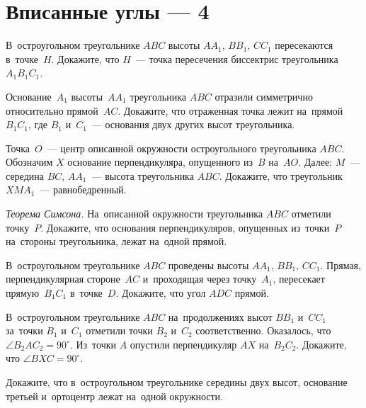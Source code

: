 
\section*{Вписанные углы --- 4}


\begin{problems}

\item
В~остроугольном треугольнике $ABC$ высоты $A A_1$, $B B_1$, $C C_1$
пересекаются в~точке~$H$.
Докажите, что $H$~--- точка пересечения биссектрис треугольника $A_1 B_1 C_1$.

\item
Основание~$A_1$ высоты~$A A_1$ треугольника $ABC$ отразили симметрично
относительно прямой~$AC$.
Докажите, что отраженная точка лежит на~прямой~$B_1 C_1$, где $B_1$ и~$C_1$~---
основания двух других высот треугольника.

\item
Точка~$O$~--- центр описанной окружности остроугольного треугольника $ABC$.
Обозначим $X$ основание перпендикуляра, опущенного из~$B$ на~$AO$.
Далее: $M$~--- середина $BC$, $A A_1$~--- высота треугольника $ABC$.
Докажите, что треугольник $X M A_1$~--- равнобедренный.

\item\emph{Теорема Симсона.}
На~описанной окружности треугольника $ABC$ отметили точку~$P$.
Докажите, что основания перпендикуляров, опущенных из~точки~$P$ на~стороны
треугольника, лежат на~одной прямой.

\item
В~остроугольном треугольнике $ABC$ проведены высоты $A A_1$, $B B_1$, $C C_1$.
Прямая, перпендикулярная стороне~$AC$ и~проходящая через точку~$A_1$,
пересекает прямую~$B_1 C_1$ в~точке~$D$.
Докажите, что угол $ADC$ прямой.

\item
В~остроугольном треугольнике $ABC$ на~продолжениях высот $BB_1$ и~$CC_1$
за~точки $B_1$ и~$C_1$ отметили точки $B_2$ и~$C_2$ соответственно.
Оказалось, что $\angle B_2AC_2 = 90^{\circ}$.
Из~точки $A$ опустили перпендикуляр $AX$ на~$B_2C_2$.
Докажите, что $\angle BXC = 90^{\circ}$.

\item
Докажите, что в~остроугольном треугольнике середины двух высот, основание
третьей и~ортоцентр лежат на~одной окружности.

\end{problems}

